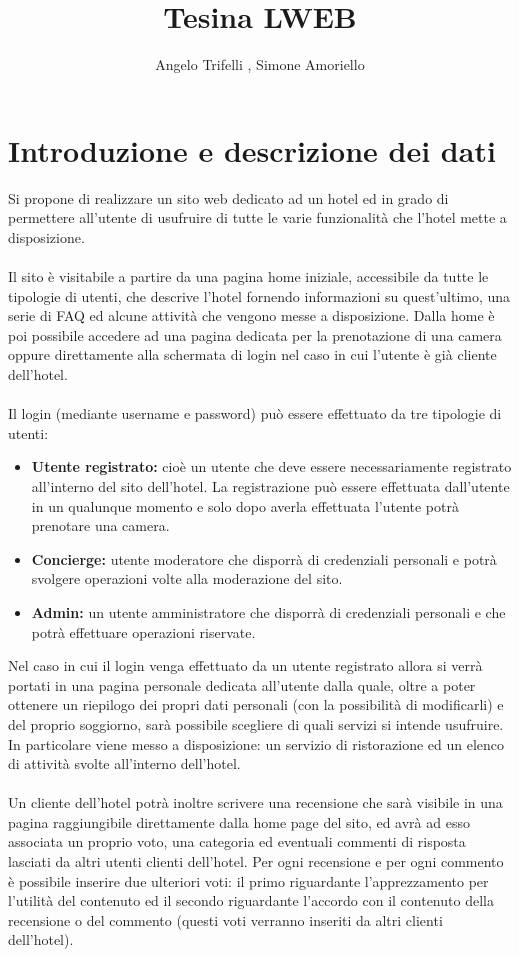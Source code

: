\documentclass [a4paper, 12pt]{book}
\begin{document}
\author{Angelo Trifelli , Simone Amoriello}
\title{Tesina LWEB}
\maketitle
\tableofcontents

\chapter{Introduzione e descrizione dei dati}

Si propone di realizzare un sito web dedicato ad un hotel ed in grado di permettere all'utente di usufruire di tutte le varie funzionalità che l'hotel mette a disposizione.\\\\
Il sito è visitabile a partire da una pagina home iniziale, accessibile da tutte le tipologie di utenti, che descrive l'hotel fornendo informazioni su quest'ultimo, una serie di FAQ ed alcune attività che vengono messe a disposizione. Dalla home è poi possibile accedere ad una pagina dedicata per la prenotazione di una camera oppure direttamente alla schermata di login nel caso in cui l'utente è già cliente dell'hotel.\\\\
Il login (mediante username e password) può essere effettuato da tre tipologie di utenti:
\begin{itemize}
\item \textbf{Utente registrato:} cioè un utente che deve essere necessariamente registrato all'interno del sito dell'hotel. La registrazione può essere effettuata dall'utente in un qualunque momento e solo dopo averla effettuata l'utente potrà prenotare una camera.
\item \textbf{Concierge:} utente moderatore che disporrà di credenziali personali e potrà svolgere operazioni volte alla moderazione del sito.
\item \textbf{Admin:} un utente amministratore che disporrà di credenziali personali e che potrà effettuare operazioni riservate.
\end{itemize}
Nel caso in cui il login venga effettuato da un utente registrato allora si verrà portati in una pagina personale dedicata all'utente dalla quale, oltre a poter ottenere un riepilogo dei propri dati personali (con la possibilità di modificarli) e del proprio soggiorno, sarà possibile scegliere di quali servizi si intende usufruire. In particolare viene messo a disposizione: un servizio di ristorazione ed un elenco di attività svolte all'interno dell'hotel. \\\\Un cliente dell'hotel potrà inoltre scrivere una recensione che sarà visibile in una pagina raggiungibile direttamente dalla home page del sito, ed avrà ad esso associata un proprio voto, una categoria ed eventuali commenti di risposta lasciati da altri utenti clienti dell'hotel. Per ogni recensione e per ogni commento è possibile inserire due ulteriori voti: il primo riguardante l'apprezzamento per l'utilità del contenuto ed il secondo riguardante l'accordo con il contenuto della recensione o del commento (questi voti verranno inseriti da altri clienti dell'hotel).\\\\
\end{document}
